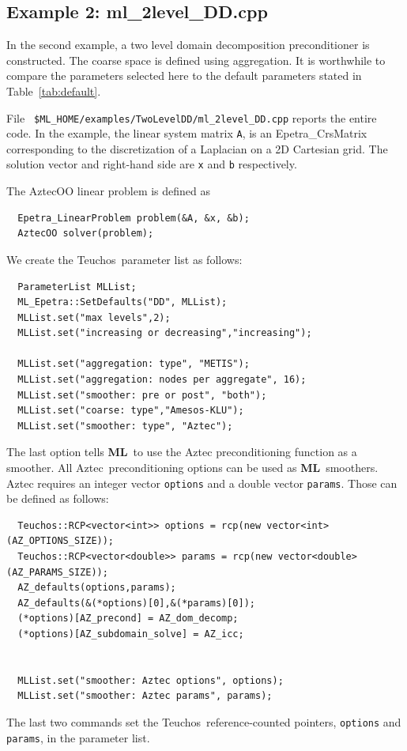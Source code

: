 \documentclass{article}[11pt]
\newcommand{\Aztec}  {{\sc Aztec}}
\newcommand{\ML}     {{\bf ML}}
\newcommand{\teuchos}  {{\sc Teuchos}}
\begin{document}
\subsection{Example 2: ml\_2level\_DD.cpp}
\label{parameter list ex. 2}

In the second example, 
a two level domain decomposition preconditioner is constructed.
The coarse space is defined using aggregation. 
It is worthwhile to compare the parameters selected here
to the default parameters stated in Table~\ref{tab:default}.

File {\tt
  \$ML\_HOME/examples/TwoLevelDD/ml\_2level\_DD.cpp}
reports the entire code.  In the example, the linear system matrix
\verb!A!,  is an Epetra\_CrsMatrix corresponding to the
discretization of a Laplacian on a 2D Cartesian grid. 
The solution vector and right-hand side are \verb!x! and \verb!b! respectively.

\noindent
The AztecOO linear problem is defined as
\begin{verbatim}
  Epetra_LinearProblem problem(&A, &x, &b);
  AztecOO solver(problem);
\end{verbatim}

\noindent
We create the \teuchos~parameter  list as follows:
\begin{verbatim}
  ParameterList MLList;
  ML_Epetra::SetDefaults("DD", MLList);
  MLList.set("max levels",2);
  MLList.set("increasing or decreasing","increasing");

  MLList.set("aggregation: type", "METIS");
  MLList.set("aggregation: nodes per aggregate", 16);
  MLList.set("smoother: pre or post", "both");
  MLList.set("coarse: type","Amesos-KLU");
  MLList.set("smoother: type", "Aztec");
\end{verbatim}
The last option tells \ML\ to use the {\sc Aztec} preconditioning
function as a smoother. All \Aztec~preconditioning options can be used
as \ML~smoothers.  {\sc Aztec} requires an integer vector \verb!options!
and a double vector \verb!params!. Those can be defined as follows:
\begin{verbatim}
  Teuchos::RCP<vector<int>> options = rcp(new vector<int>(AZ_OPTIONS_SIZE));
  Teuchos::RCP<vector<double>> params = rcp(new vector<double>(AZ_PARAMS_SIZE));
  AZ_defaults(options,params);
  AZ_defaults(&(*options)[0],&(*params)[0]);
  (*options)[AZ_precond] = AZ_dom_decomp;
  (*options)[AZ_subdomain_solve] = AZ_icc;


  MLList.set("smoother: Aztec options", options);
  MLList.set("smoother: Aztec params", params);
\end{verbatim}
The last two commands set the \teuchos\ reference-counted pointers,
{\tt options} and {\tt params}, in the parameter list.
\end{document}
